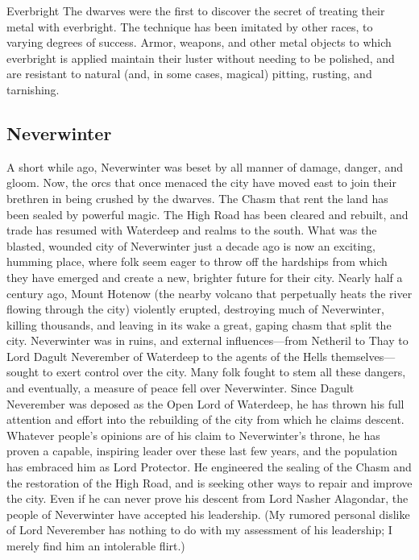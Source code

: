 \documentclass[10pt,a4paper,twoside,twocolumn,openany,bg=print,nodeprecatedcode]{dndbook}
\begin{document}
\begin{DndComment}{Everbright}
The dwarves were the first to discover the secret of treating their metal with everbright. The technique has been imitated by other races, to varying degrees of success. Armor, weapons, and other metal objects to which everbright is applied maintain their luster without needing to be polished, and are resistant to natural (and, in some cases, magical) pitting, rusting, and tarnishing.
\end{DndComment}

\subsection{Neverwinter}
A short while ago, Neverwinter was beset by all manner of damage, danger, and gloom. Now, the orcs that once menaced the city have moved east to join their brethren in being crushed by the dwarves. The Chasm that rent the land has been sealed by powerful magic. The High Road has been cleared and rebuilt, and trade has resumed with Waterdeep and realms to the south. What was the blasted, wounded city of Neverwinter just a decade ago is now an exciting, humming place, where folk seem eager to throw off the hardships from which they have emerged and create a new, brighter future for their city.
Nearly half a century ago, Mount Hotenow (the nearby volcano that perpetually heats the river flowing through the city) violently erupted, destroying much of Neverwinter, killing thousands, and leaving in its wake a great, gaping chasm that split the city. Neverwinter was in ruins, and external influences—from Netheril to Thay to Lord Dagult Neverember of Waterdeep to the agents of the Hells themselves—sought to exert control over the city. Many folk fought to stem all these dangers, and eventually, a measure of peace fell over Neverwinter.
Since Dagult Neverember was deposed as the Open Lord of Waterdeep, he has thrown his full attention and effort into the rebuilding of the city from which he claims descent. Whatever people's opinions are of his claim to Neverwinter's throne, he has proven a capable, inspiring leader over these last few years, and the population has embraced him as Lord Protector. He engineered the sealing of the Chasm and the restoration of the High Road, and is seeking other ways to repair and improve the city. Even if he can never prove his descent from Lord Nasher Alagondar, the people of Neverwinter have accepted his leadership. (My rumored personal dislike of Lord Neverember has nothing to do with my assessment of his leadership; I merely find him an intolerable flirt.)
\end{document}

